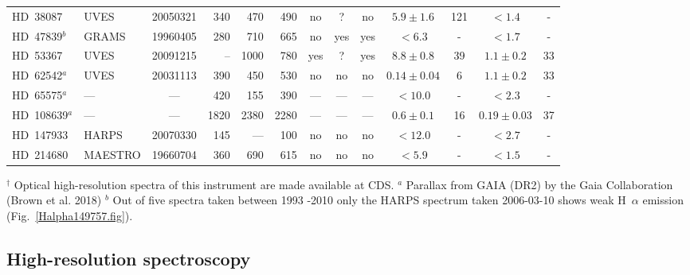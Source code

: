 \documentclass[tradiabstract]{aa} %
\begin{document}
\begin{table*} [h!tb]
\begin{center}
\begin{tabular}{l lc rrr ccc  cccc }
HD~38087   &  \scriptsize{UVES}      &  \scriptsize{20050321}  & 340& 470& 490      & \scriptsize{no}                 & \scriptsize{?}       & \scriptsize{no}     &\small{$ 5.9 \pm 1.6 $}& 121 & \small{$ <1.4 $}& - \\
HD~47839$^b$&  \scriptsize{GRAMS}    &  \scriptsize{19960405}  & 280& 710& 665      & \scriptsize{no}               & \scriptsize{yes}     & \scriptsize{yes}     &\small{$ <6.3        $}& - & \small{$<1.7 $}& - \\
HD~53367   &  \scriptsize{UVES}      &  \scriptsize{20091215}  & --& 1000& 780      & \scriptsize{yes}        & \scriptsize{?}       & \scriptsize{yes}            &\small{$8.8  \pm 0.8 $}& 39 & \small{$  1.1 \pm  0.2 $}& 33 \\
HD~62542$^a$   &  \scriptsize{UVES}      &  \scriptsize{20031113}  & 390& 450& 530      & \scriptsize{no}                 & \scriptsize{no}      & \scriptsize{no} &\small{$0.14 \pm 0.04$}& 6 & \small{$  1.1\pm  0.2$}& 33 \\
HD~65575$^a$  &  ---       &  ---       & 420& 155& 390      & ---                & ---     & --- &\small{$<10.0        $}& - & \small{$< 2.3 $}& - \\
HD~108639$^a$&  ---       &  ---       & 1820& 2380& 2280    & ---                & ---     & --- &\small{$0.6 \pm 0.1  $}& 16 & \small{$ 0.19 \pm 0.03 $}& 37 \\
HD~147933  &  \scriptsize{HARPS}     &  \scriptsize{20070330}  & 145& ---& 100      & \scriptsize{no}                 & \scriptsize{no}      & \scriptsize{no}     &\small{$<  12.0      $}& - & \small{$<2.7 $}& - \\
HD~214680  &  \scriptsize{MAESTRO}   &  \scriptsize{19660704}  & 360& 690& 615      & \scriptsize{no}                 & \scriptsize{no}      & \scriptsize{no}     &\small{$<   5.9      $}& - & \small{$<1.5 $}& - \\
\hline
\end{tabular}
\end{center}
$^{\dag}$ Optical high-resolution spectra of this instrument are made
available at CDS.  $^a$ Parallax from GAIA (DR2) by the Gaia
Collaboration (Brown et al. 2018) $^b$ Out of five spectra taken
between 1993 -2010 only the HARPS spectrum taken 2006-03-10 shows weak
H~$\alpha$ emission (Fig.~\ref{Halpha149757.fig}).
\end{table*}


\subsection{High-resolution spectroscopy}
\end{document}
